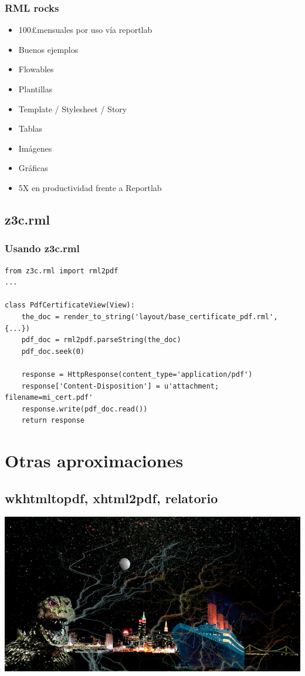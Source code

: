 \documentclass[8pt,xcolor={usenames,dvipsnames}]{beamer}
\begin{document}
\begin{frame}
\frametitle{RML rocks}
\begin{itemize}
\item 100\pounds mensuales por uso vía reportlab
\item Buenos ejemplos
\item Flowables
\item Plantillas
\item Template / Stylesheet / Story
\item Tablas
\item Imágenes
\item Gráficas
\item 5X en productividad frente a Reportlab
\end{itemize}
\end{frame}

\subsection{z3c.rml}

\begin{frame}[fragile]
\frametitle{Usando z3c.rml}
\begin{verbatim}
from z3c.rml import rml2pdf
...

class PdfCertificateView(View):
    the_doc = render_to_string('layout/base_certificate_pdf.rml', {...})
    pdf_doc = rml2pdf.parseString(the_doc)
    pdf_doc.seek(0)

    response = HttpResponse(content_type='application/pdf')
    response['Content-Disposition'] = u'attachment; filename=mi_cert.pdf'
    response.write(pdf_doc.read())
    return response

\end{verbatim}
\end{frame}

\section{Otras aproximaciones}
\subsection{wkhtmltopdf, xhtml2pdf, relatorio}

\begin{frame}
\includegraphics[width=\paperwidth]{images/loo.jpg}
\end{frame}
\end{document}
